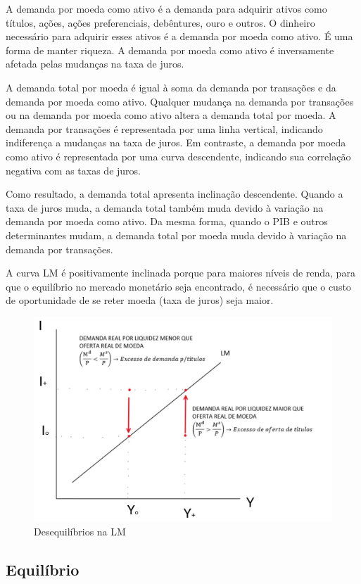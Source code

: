 \documentclass[a4paper,12pt]{article}[abntex2]
\begin{document}
A demanda por moeda como ativo é a demanda para adquirir ativos como títulos, ações, ações preferenciais, debêntures, ouro e outros. O dinheiro necessário para adquirir esses ativos é a demanda por moeda como ativo. É uma forma de manter riqueza. A demanda por moeda como ativo é inversamente afetada pelas mudanças na taxa de juros.

A demanda total por moeda é igual à soma da demanda por transações e da demanda por moeda como ativo. Qualquer mudança na demanda por transações ou na demanda por moeda como ativo altera a demanda total por moeda. A demanda por transações é representada por uma linha vertical, indicando indiferença a mudanças na taxa de juros. Em contraste, a demanda por moeda como ativo é representada por uma curva descendente, indicando sua correlação negativa com as taxas de juros.

Como resultado, a demanda total apresenta inclinação descendente. Quando a taxa de juros muda, a demanda total também muda devido à variação na demanda por moeda como ativo. Da mesma forma, quando o PIB e outros determinantes mudam, a demanda total por moeda muda devido à variação na demanda por transações.

A curva LM é positivamente inclinada porque para maiores níveis de renda, para que o equilíbrio no mercado monetário seja encontrado, é necessário que o custo de oportunidade de se reter moeda (taxa de juros) seja maior.

\begin{figure}[H]
    \centering    
    \caption{Desequilíbrios na LM}
    \includegraphics[width=0.75\linewidth]{Imagens/a3i1.png}
\end{figure}

\subsection{\textbf{Equilíbrio}}
\end{document}
